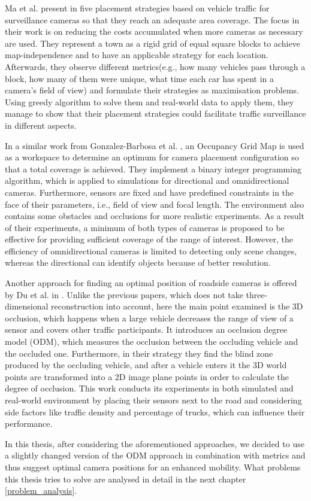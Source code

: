 Ma et al. present in \cite{surveillance_related_work} five placement strategies based on vehicle traffic for surveillance cameras so that they reach an adequate area coverage. The focus in their work is on reducing the costs accumulated when more cameras as necessary are used. They represent a town as a rigid grid of equal square blocks to achieve map-independence and to have an applicable strategy for each location. Afterwards, they observe different metrics(e.g., how many vehicles pass through a block, how many of them were unique, what time each car has spent in a camera's field of view) and formulate their strategies as maximisation problems. Using greedy algorithm to solve them and real-world data to apply them, they manage to show that their placement strategies could facilitate traffic surveillance in different aspects. 

In a similar work from Gonzalez-Barbosa et al. \cite{total_coverage_optimum}, an Occupancy Grid Map is used as a workspace to determine an optimum for camera placement configuration so that a total coverage is achieved. They implement a binary integer programming algorithm, which is applied to simulations for directional and omnidirectional cameras. Furthermore, sensors are fixed and have predefined constraints in the face of their parameters, i.e., field of view and focal length. The environment also contains some obstacles and occlusions for more realistic experiments. As a result of their experiments, a minimum of both types of cameras is proposed to be effective for providing sufficient coverage of the range of interest. However, the efficiency of omnidirectional cameras is limited to detecting only scene changes, whereas the directional can identify objects because of better resolution.

Another approach for finding an optimal position of roadside cameras is offered by Du et al. in  \cite{occlusion_degree_model}. Unlike the previous papers, which does not take three-dimensional reconstruction into account, here the main point examined is the 3D occlusion, which happens when a large vehicle decreases the range of view of a sensor and covers other traffic participants. It introduces an occlusion degree model (ODM), which measures the occlusion between the occluding vehicle and the occluded one. Furthermore, in their strategy they find the blind zone produced by the occluding vehicle, and after a vehicle enters it the 3D world points are transformed into a 2D image plane points in order to calculate the degree of occlusion. This work conducts its experiments in both simulated and real-world environment by placing their sensors next to the road and considering side factors like traffic density and percentage of trucks, which can influence their performance.

In this thesis, after considering the aforementioned approaches, we decided to use a slightly changed version of the ODM approach in combination with  metrics and thus suggest optimal camera positions for an enhanced mobility. What problems this thesis tries to solve are analysed in detail in the next chapter \ref{problem_analysis}.
